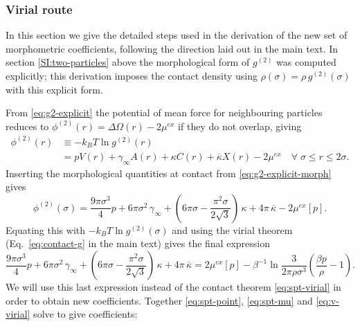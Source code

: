 \documentclass[11pt]{report}
\begin{document}
\subsubsection{Virial route}

In this section we give the detailed steps used in the derivation of the new set of morphometric coefficients, following the direction laid out in the main text.
In section \ref{SI:two-particles} above the morphological form of $g^{(2)}$ was computed explicitly; this derivation imposes the contact density using $\rho(\sigma) = \rho \, g^{(2)}(\sigma)$ with this explicit form.

From \eqref{eq:g2-explicit} the potential of mean force for neighbouring particles reduces to $\phi^{(2)}(r) = \Delta\Omega(r) - 2\mu^{ex}$ if they do not overlap, giving
\begin{equation}
  \begin{split}
  \phi^{(2)}(r) &\equiv - k_B T \ln g^{(2)}(r) \\
  &= pV(r) + \gamma_\infty A(r) + \kappa C(r) + \overline{\kappa} X(r) - 2\mu^{ex}
  \quad \forall \; \sigma \le r \le 2\sigma.
  \end{split}
\end{equation}
Inserting the morphological quantities at contact from \eqref{eq:g2-explicit-morph} gives
\begin{equation}
  \phi^{(2)}(\sigma) =
  \frac{9\pi \sigma^3}{4} p +
  6\pi\sigma^2 \, \gamma_\infty +
  \left( 6\pi\sigma - \frac{\pi^2\sigma}{2\sqrt{3}} \right) \, \kappa +
  4\pi \, \overline{\kappa}
  - 2\mu^{ex}[p].
\end{equation}
Equating this with $-k_B T \ln g^{(2)}(\sigma)$ and using the virial theorem (Eq.\ \eqref{eq:contact-g} in the main text) gives the final expression
\begin{equation}\label{eq:v-virial}
  \frac{9\pi \sigma^3}{4} p +
  6\pi\sigma^2 \, \gamma_\infty +
  \left( 6\pi\sigma - \frac{\pi^2\sigma}{2\sqrt{3}} \right) \, \kappa +
  4\pi \, \overline{\kappa} =
  2\mu^{ex}[p] - \beta^{-1} \ln{\frac{3}{2\pi \rho \sigma^3} \left( \frac{\beta p}{\rho} - 1 \right)}.
\end{equation}
We will use this last expression instead of the contact theorem \eqref{eq:spt-virial} in order to obtain new coefficients.
Together \eqref{eq:spt-point}, \eqref{eq:spt-mu} and \eqref{eq:v-virial} solve to give coefficients:
\end{document}
